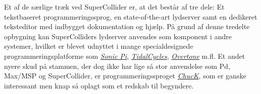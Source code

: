 Et af de særlige træk ved SuperCollider er, at det består af tre dele: Et tekstbaseret programmeringssprog, en state-of-the-art lydserver samt en dedikeret teksteditor med indbygget dokumentation og hjælp. På grund af denne tredelte opbygning kan SuperColliders lydserver anvendes som komponent i andre systemer, hvilket er blevet udnyttet i mange specialdesignede programmeringsplatforme som \href{https://sonic-pi.net/}{\textit{Sonic Pi}}, \href{https://tidalcycles.org/}{\textit{TidalCycles}}, \href{https://overtone.github.io/}{\textit{Overtone}} m.fl. Et andet nyere skud på stammen, der dog ikke har lige så stor anvendelse som Pd, Max/MSP og SuperCollider, er programmeringssproget \href{https://chuck.cs.princeton.edu/}{\textit{ChucK}}, som er ganske interessant men knap så oplagt som et redskab til begyndere.

